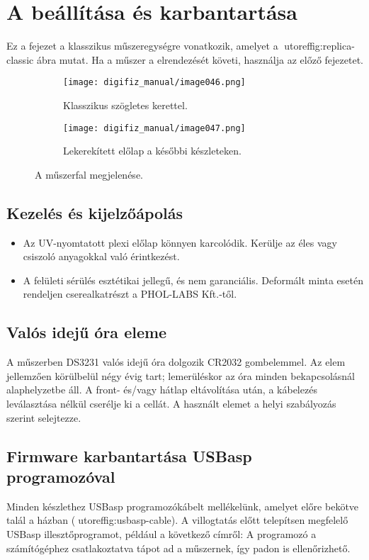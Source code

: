 \chapter{A \ReplicaGenOne{} beállítása és karbantartása}\label{ch:replica-setup}

Ez a fejezet a klasszikus \ReplicaGenOne{} műszeregységre vonatkozik, amelyet a utoref{fig:replica-classic} ábra mutat. Ha a műszer a \ReplicaNextLong{} elrendezését követi, használja az előző fejezetet.

\begin{figure}[htbp]
    \centering
    \begin{subfigure}{0.46\textwidth}
        \texttt{[image: digifiz\_manual/image046.png]}
        \caption{Klasszikus \ReplicaGenOne{} szögletes kerettel.}
    \end{subfigure}\hfill
    \begin{subfigure}{0.46\textwidth}
        \texttt{[image: digifiz\_manual/image047.png]}
        \caption{Lekerekített előlap a későbbi készleteken.}
    \end{subfigure}
    \caption{A \ReplicaGenOne{} műszerfal megjelenése.}
    \label{fig:replica-classic}
\end{figure}

\section{Kezelés és kijelzőápolás}
\begin{itemize}
    \item Az UV-nyomtatott plexi előlap könnyen karcolódik. Kerülje az éles vagy csiszoló anyagokkal való érintkezést.
    \item A felületi sérülés esztétikai jellegű, és nem garanciális. Deformált minta esetén rendeljen cserealkatrészt a PHOL-LABS Kft.-től.
\end{itemize}

\section{Valós idejű óra eleme}
A műszerben DS3231 valós idejű óra dolgozik CR2032 gombelemmel. Az elem jellemzően körülbelül négy évig tart; lemerüléskor az óra minden bekapcsolásnál alaphelyzetbe áll. A front- és/vagy hátlap eltávolítása után, a kábelezés leválasztása nélkül cserélje ki a cellát. A használt elemet a helyi szabályozás szerint selejtezze.

\section{Firmware karbantartása USBasp programozóval}
Minden készlethez USBasp programozókábelt mellékelünk, amelyet előre bekötve talál a házban (utoref{fig:usbasp-cable}). A villogtatás előtt telepítsen megfelelő USBasp illesztőprogramot, például a következő címről:
A programozó a számítógéphez csatlakoztatva tápot ad a műszernek, így padon is ellenőrizhető.

